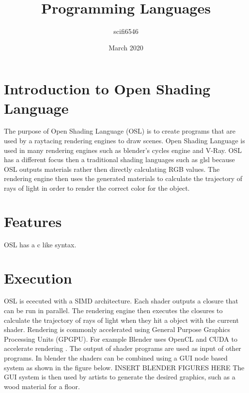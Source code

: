 \documentclass{article}
\title{Programming Languages}
\author{scifi6546 }
\date{March 2020}
\begin{document}
\maketitle

\section{Introduction to Open Shading Language}
The purpose of Open Shading Language (OSL) is to create programs that are used by a raytacing rendering engines to draw scenes. Open Shading Language is used in many rendering engines such as blender's cycles engine and V-Ray. OSL has a different focus then a traditional shading languages such as glsl because OSL outputs materials rather then directly calculating RGB values. The rendering engine then uses the generated materials to calculate the trajectory of rays of light in order to render the correct color for the object. 
\section{Features}
OSL has a c like syntax.
\section{Execution}
OSL is ececuted with a SIMD architecture. Each shader outputs a closure that can be run in parallel. The rendering engine then executes the closures to calculate the trajectory of rays of light when they hit a object with the current shader.  Rendering is commonly accelerated using General Purpose Graphics Processing Units (GPGPU). For example Blender uses OpenCL and CUDA to accelerate rendering \cite{blender_gpu}. The output of shader programs are used as input of other programs. In blender the shaders can be combined using a GUI node based system as shown in the figure below. \newline
INSERT BLENDER FIGURES HERE
\newline
The GUI system is then used by artists to generate the desired graphics, such as a wood material for a floor.
\end{document}

